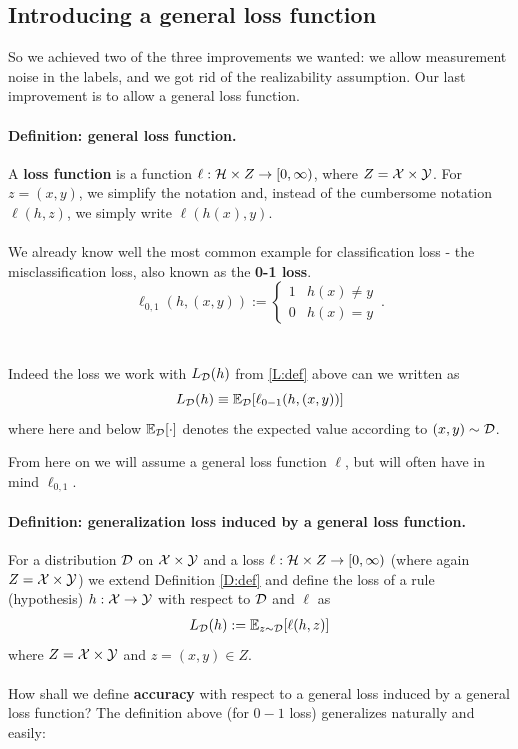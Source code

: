 \subsection{Introducing a general loss function}

So we achieved two of the three improvements we wanted: we allow measurement
noise in the labels, and we got rid of the realizability assumption. 
Our last improvement is to allow a general loss function.
 \paragraph{Definition:  general loss function.}
 A {\bf loss function} is a function $\ell:\mathcal{H} \times Z\to[0,\infty)$, where 
 $Z = \mathcal{X}\times\mathcal{Y}$.
For  $z=(x,y)$, we simplify the notation and, instead of the cumbersome notation
$\ell(h,z)$, we simply write  $\ell(h(x),y)$.
\\~\\
We already know well the most common example for classification loss - the
misclassification loss, also known as the  {\bf 0-1 loss}.
\[
    \ell_{0,1}(h,(x,y)):=
    \begin{cases}
        1 & h(x)\neq y\\
        0 & h(x)= y
\end{cases}\,.
\]
\\~\\
Indeed the loss we work with $L_{\mathcal{D}}(h)$ from \eqref{L:def} above can we written
as 
\[
    L_{\mathcal{D}}(h) \equiv \mathbb{E}_{\mathcal{D}} [\ell_{0-1}(h,(x,y))]
\]
where here and below $\mathbb{E}_{\mathcal{D}}[\cdot]$ denotes the expected value according to
$(x,y)\sim \mathcal{D}$. 

From here on we will assume a general loss function $\ell$, but will often
have in mind $\ell_{0,1}$.

\paragraph{Definition: generalization loss induced by a general loss function.}
 For a distribution $\mathcal{D}$ on $\mathcal{X}\times\mathcal{Y}$ and a loss $\ell:\mathcal{H}\times Z\to[0,\infty)$
 (where again $Z=\mathcal{X}\times \mathcal{Y}$) we
 extend Definition \ref{D:def} and define the loss of a rule (hypothesis)
 $h:\mathcal{X}\to\mathcal{Y}$ with respect to $\mathcal{D}$ and $\ell$ as
 \begin{eqnarray*}
     L_{\mathcal{D}}(h) := \mathbb{E}_{z\sim\mathcal{D}}[\ell(h,z)]
 \end{eqnarray*}
 where $Z=\mathcal{X}\times\mathcal{Y}$ and $z=(x,y)\in Z$.
\\~\\
How shall we define {\bf accuracy} with respect to a general loss induced by a
general loss function? The definition above (for $0-1$ loss) generalizes
naturally and easily:
%
